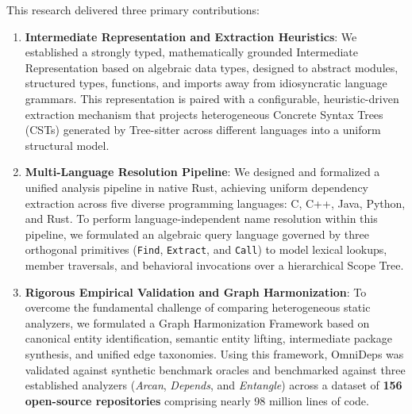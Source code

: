 This research delivered three primary contributions:
\begin{enumerate}
  \item \textbf{Intermediate Representation and Extraction Heuristics}:
    We established a strongly typed, mathematically grounded Intermediate
    Representation based on algebraic data types, designed
    to abstract modules, structured types, functions, and imports away from
    idiosyncratic language grammars. This representation is paired with a
    configurable, heuristic-driven extraction mechanism that projects
    heterogeneous Concrete Syntax Trees (CSTs) generated by Tree-sitter across
    different languages into a uniform structural model.
  \item \textbf{Multi-Language Resolution Pipeline}:
    We designed and formalized a unified analysis pipeline in native Rust,
    achieving uniform dependency extraction across five diverse programming
    languages: C, C++, Java, Python, and Rust. To perform language-independent
    name resolution within this pipeline, we formulated an algebraic query
    language governed by three orthogonal primitives (\texttt{Find},
    \texttt{Extract}, and \texttt{Call}) to model lexical lookups, member
    traversals, and behavioral invocations over a hierarchical Scope Tree.
  \item \textbf{Rigorous Empirical Validation and Graph Harmonization}:
    To overcome the fundamental challenge of comparing heterogeneous static
    analyzers, we formulated a Graph Harmonization Framework based on
    canonical entity identification, semantic entity lifting,
    intermediate package synthesis, and unified edge taxonomies. Using this
    framework, OmniDeps was validated against synthetic benchmark oracles
    and benchmarked against three established analyzers (\textit{Arcan},
    \textit{Depends}, and \textit{Entangle}) across a dataset of \textbf{156
    open-source repositories} comprising nearly 98 million lines of code.
\end{enumerate}

